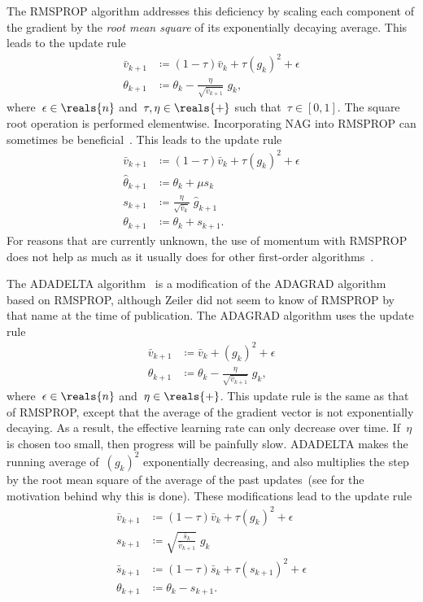 \documentclass[11pt,a4paper]{article}
\numberwithin{equation}{section}
\begin{document}
The RMSPROP algorithm addresses this deficiency by scaling each component of the
gradient by the \emph{root mean square} of its exponentially decaying average.
This leads to the update rule
\begin{align*}
	\bar{v}_{k + 1} &\coloneqq (1 - \tau) \bar{v}_k + \tau (g_k)^2 + \epsilon \\
	\theta_{k + 1}  &\coloneqq \theta_k - \frac{\eta}{\sqrt{\bar{v}_{k + 1}}} \; g_k,
\end{align*}
where~$\epsilon \in \reals{n}$ and~$\tau, \eta \in \reals{+}$ such that~$\tau
\in [0, 1]$. The square root operation is performed elementwise. Incorporating
NAG into RMSPROP can sometimes be beneficial~\citep{hinton-nnml-2014,
climin-rmsprop}. This leads to the update rule
\begin{align*}
	\bar{v}_{k + 1}      &\coloneqq (1 - \tau) \bar{v}_k + \tau (g_k)^2 + \epsilon \\
	\hat{\theta}_{k + 1} &\coloneqq \theta_k + \mu s_k \\
	s_{k + 1}            &\coloneqq \frac{\eta}{\sqrt{\bar{v}_k}} \; \hat{g}_{k + 1} \\
	\theta_{k + 1}       &\coloneqq \theta_k + s_{k + 1}.
\end{align*}
For reasons that are currently unknown, the use of momentum with RMSPROP does
not help as much as it usually does for other first-order
algorithms~\citep{hinton-nnml-2014}.

The ADADELTA algorithm~\citep{zeiler2012adadelta} is a modification of the
ADAGRAD algorithm based on RMSPROP, although Zeiler did not seem to know of
RMSPROP by that name at the time of publication. The ADAGRAD algorithm uses the
update rule
\begin{align*}
	\bar{v}_{k + 1} &\coloneqq \bar{v}_k + (g_k)^2 + \epsilon \\
	\theta_{k + 1}  &\coloneqq \theta_k - \frac{\eta}{\sqrt{\bar{v}_{k + 1}}} \; g_k,
\end{align*}
where~$\epsilon \in \reals{n}$ and~$\eta \in \reals{+}$. This update rule is the
same as that of RMSPROP, except that the average of the gradient vector is not
exponentially decaying. As a result, the effective learning rate can only
decrease over time. If~$\eta$ is chosen too small, then progress will be
painfully slow. ADADELTA makes the running average of~$(g_k)^2$ exponentially
decreasing, and also multiplies the step by the root mean square of the average
of the past updates~(see \citet{zeiler2012adadelta} for the motivation behind
why this is done). These modifications lead to the update rule
\begin{align*}
	\bar{v}_{k + 1} &\coloneqq (1 - \tau) \bar{v}_k + \tau (g_k)^2 + \epsilon \\
	s_{k + 1}       &\coloneqq \sqrt{\frac{\bar{s}_k}{\bar{v}_{k + 1}}} \; g_k \\
	\bar{s}_{k + 1} &\coloneqq (1 - \tau) \bar{s}_k + \tau (s_{k + 1})^2 + \epsilon \\
	\theta_{k + 1}  &\coloneqq \theta_k - s_{k + 1}.
\end{align*}
\end{document}
